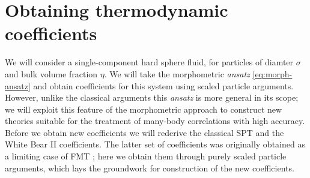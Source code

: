 \documentclass[11pt,twoside]{report}
\begin{document}


\section{Obtaining thermodynamic coefficients}
\label{sec:spt}

We will consider a single-component hard sphere fluid, for particles of diamter $\sigma$ and bulk volume fraction $\eta$.
We will take the morphometric \emph{ansatz} \eqref{eq:morph-ansatz} and obtain coefficients for this system using scaled particle arguments.
However, unlike the classical arguments this \emph{ansatz} is more general in its scope; we will exploit this feature of the morphometric approach to construct new theories suitable for the treatment of many-body correlations with high accuracy.
Before we obtain new coefficients we will rederive the classical SPT and the White Bear II coefficients.
The latter set of coefficients was originally obtained as a limiting case of FMT \cite{Hansen-GoosJPCM2006}; here we obtain them through purely scaled particle arguments, which lays the groundwork for construction of the new coefficients.
\end{document}
